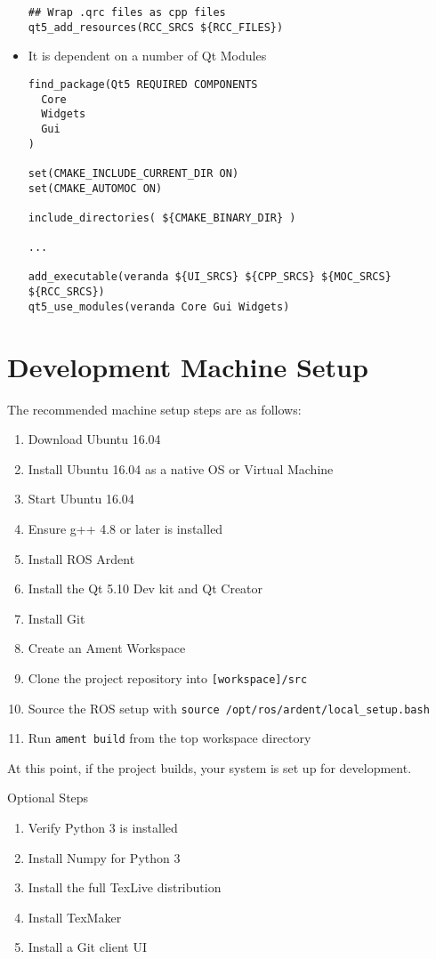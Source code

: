 \begin{itemize}
\begin{lstlisting}
## Wrap .qrc files as cpp files
qt5_add_resources(RCC_SRCS ${RCC_FILES})
	\end{lstlisting}
	\item It is dependent on a number of Qt Modules
	\begin{lstlisting}
find_package(Qt5 REQUIRED COMPONENTS
  Core
  Widgets
  Gui
)

set(CMAKE_INCLUDE_CURRENT_DIR ON)
set(CMAKE_AUTOMOC ON)

include_directories( ${CMAKE_BINARY_DIR} )

...

add_executable(veranda ${UI_SRCS} ${CPP_SRCS} ${MOC_SRCS} ${RCC_SRCS})
qt5_use_modules(veranda Core Gui Widgets)
	\end{lstlisting}
\end{itemize}

\section{Development Machine Setup}
The recommended machine setup steps are as follows:
\begin{enumerate}
	\item Download Ubuntu 16.04
	\item Install Ubuntu 16.04 as a native OS or Virtual Machine
	\item Start Ubuntu 16.04
	\item Ensure g++ 4.8 or later is installed
	\item Install ROS Ardent
	\item Install the Qt 5.10 Dev kit and Qt Creator
	\item Install Git
	\item Create an Ament Workspace
	\item Clone the project repository into \lstinline|[workspace]/src|
	\item Source the ROS setup with \lstinline|source /opt/ros/ardent/local_setup.bash|
	\item Run \lstinline|ament build| from the top workspace directory
\end{enumerate}
At this point, if the project builds, your system is set up for development.

Optional Steps
\begin{enumerate}
	\item Verify Python 3 is installed
	\item Install Numpy for Python 3
	\item Install the full TexLive distribution
	\item Install TexMaker
	\item Install a Git client UI
\end{enumerate}
